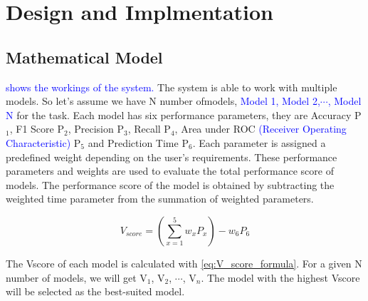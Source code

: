 \documentclass[a4paper,fleqn]{cas-dc}
\newcommand{\responsemodsm}[1]{\textcolor{blue}{#1}}
\begin{document}
\section{Design and Implmentation}\label{sec:design_and_implmentation}

\subsection{Mathematical Model}\label{subsec:mathematical_model}

\responsemodsm{ shows the workings of the system.} The system is able to work with multiple models. So let's assume we have N number ofmodels, \responsemodsm{Model 1, Model 2,$\cdots$, Model N} for the task. Each model has six performance parameters, they are Accuracy P$_1$, F1 Score P$_2$, Precision P$_3$, Recall P$_4$, Area under ROC \responsemodsm{(Receiver Operating Characteristic)} P$_5$ and Prediction Time P$_6$. Each parameter is assigned a predefined weight depending on the user's requirements. These performance parameters and weights are used to evaluate the total performance score of models. The performance score of the model is obtained by subtracting the weighted time parameter from the summation of weighted parameters.

\begin{equation}\label{eq:V_score_formula}
    V_{score} = \left(\sum_{x=1}^5 w_xP_x\right) - w_6P_6
\end{equation}

The Vscore of each model is calculated with \cref{eq:V_score_formula}. For a given N number of models, we will get V$_1$, V$_2$, $\cdots$, V$_n$. The model with the highest Vscore will be selected as the best-suited model.
\end{document}
